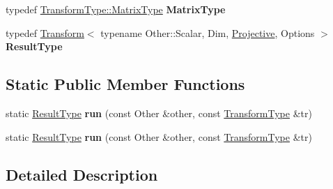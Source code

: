 \begin{DoxyCompactItemize}
typedef \hyperlink{group___geometry___module_a30f72ba46abc2bb3c7fa919c1078fc9c}{Transform\+Type\+::\+Matrix\+Type} {\bfseries Matrix\+Type}
\item 
\mbox{\label{struct_eigen_1_1internal_1_1transform__left__product__impl_3_01_other_00_01_mode_00_01_options_0d7a5c2fda4fe7320ea55777493bf1a2a_a38cc6c0dabbab7549c37bd8c1fbfbd18}} 
typedef \hyperlink{group___geometry___module_class_eigen_1_1_transform}{Transform}$<$ typename Other\+::\+Scalar, Dim, \hyperlink{group__enums_ggaee59a86102f150923b0cac6d4ff05107aead6a2de12a17aaa4f5c523215dfccad}{Projective}, Options $>$ {\bfseries Result\+Type}
\end{DoxyCompactItemize}
\subsection*{Static Public Member Functions}
\begin{DoxyCompactItemize}
\item 
\mbox{\label{struct_eigen_1_1internal_1_1transform__left__product__impl_3_01_other_00_01_mode_00_01_options_0d7a5c2fda4fe7320ea55777493bf1a2a_a968981b9c9565d8e00045b0a1eed4018}} 
static \hyperlink{group___geometry___module_class_eigen_1_1_transform}{Result\+Type} {\bfseries run} (const Other \&other, const \hyperlink{group___geometry___module_class_eigen_1_1_transform}{Transform\+Type} \&tr)
\item 
\mbox{\label{struct_eigen_1_1internal_1_1transform__left__product__impl_3_01_other_00_01_mode_00_01_options_0d7a5c2fda4fe7320ea55777493bf1a2a_a968981b9c9565d8e00045b0a1eed4018}} 
static \hyperlink{group___geometry___module_class_eigen_1_1_transform}{Result\+Type} {\bfseries run} (const Other \&other, const \hyperlink{group___geometry___module_class_eigen_1_1_transform}{Transform\+Type} \&tr)
\end{DoxyCompactItemize}


\subsection{Detailed Description}
